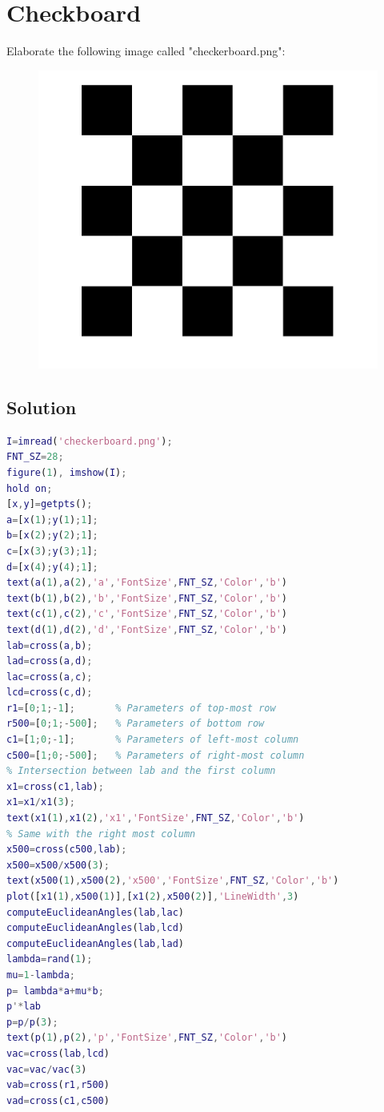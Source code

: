 \documentclass[12pt, a4paper]{report}
\begin{document}
\section{Checkboard}
    Elaborate the following image called "checkerboard.png": 
    \begin{figure}[H]
        \centering
        \includegraphics[width=0.5\linewidth]{images/checkerboard.png}
    \end{figure}
\subsection*{Solution}

    \begin{lstlisting}[language=Matlab]
I=imread('checkerboard.png');
FNT_SZ=28;
figure(1), imshow(I);
hold on;
[x,y]=getpts();
a=[x(1);y(1);1];
b=[x(2);y(2);1];
c=[x(3);y(3);1];
d=[x(4);y(4);1];
text(a(1),a(2),'a','FontSize',FNT_SZ,'Color','b')
text(b(1),b(2),'b','FontSize',FNT_SZ,'Color','b')
text(c(1),c(2),'c','FontSize',FNT_SZ,'Color','b')
text(d(1),d(2),'d','FontSize',FNT_SZ,'Color','b')
lab=cross(a,b); 
lad=cross(a,d); 
lac=cross(a,c); 
lcd=cross(c,d);
r1=[0;1;-1];       % Parameters of top-most row
r500=[0;1;-500];   % Parameters of bottom row
c1=[1;0;-1];       % Parameters of left-most column
c500=[1;0;-500];   % Parameters of right-most column
% Intersection between lab and the first column
x1=cross(c1,lab); 
x1=x1/x1(3); 
text(x1(1),x1(2),'x1','FontSize',FNT_SZ,'Color','b')
% Same with the right most column
x500=cross(c500,lab);
x500=x500/x500(3);
text(x500(1),x500(2),'x500','FontSize',FNT_SZ,'Color','b')
plot([x1(1),x500(1)],[x1(2),x500(2)],'LineWidth',3)
computeEuclideanAngles(lab,lac) 
computeEuclideanAngles(lab,lcd) 
computeEuclideanAngles(lab,lad) 
lambda=rand(1);
mu=1-lambda;
p= lambda*a+mu*b;
p'*lab
p=p/p(3);
text(p(1),p(2),'p','FontSize',FNT_SZ,'Color','b')
vac=cross(lab,lcd)
vac=vac/vac(3) 
vab=cross(r1,r500)
vad=cross(c1,c500)
    \end{lstlisting}
\end{document}
